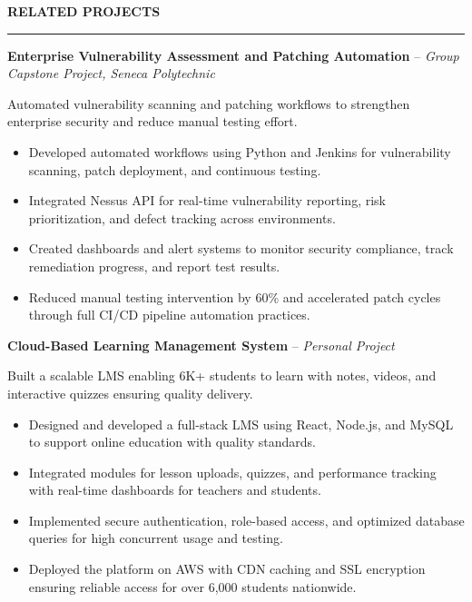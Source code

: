 \documentclass[10pt,letterpaper]{article}
\begin{document}
\vspace{6pt}

\textbf{RELATED PROJECTS}\\[-8pt]
\noindent\rule{\textwidth}{1pt}

\vspace{-2pt}

\textbf{Enterprise Vulnerability Assessment and Patching Automation} -- \emph{Group Capstone Project, Seneca Polytechnic}

\vspace{-1pt}

Automated vulnerability scanning and patching workflows to strengthen enterprise security and reduce manual testing effort.
\vspace{-1pt}
\begin{itemize}
\item Developed automated workflows using Python and Jenkins for vulnerability scanning, patch deployment, and continuous testing.
\item Integrated Nessus API for real-time vulnerability reporting, risk prioritization, and defect tracking across environments.
\item Created dashboards and alert systems to monitor security compliance, track remediation progress, and report test results.
\item Reduced manual testing intervention by 60\% and accelerated patch cycles through full CI/CD pipeline automation practices.
\end{itemize}

\textbf{Cloud-Based Learning Management System} -- \emph{Personal Project}

\vspace{-1pt}

Built a scalable LMS enabling 6K+ students to learn with notes, videos, and interactive quizzes ensuring quality delivery.
\vspace{-1pt}
\begin{itemize}
\item Designed and developed a full-stack LMS using React, Node.js, and MySQL to support online education with quality standards.
\item Integrated modules for lesson uploads, quizzes, and performance tracking with real-time dashboards for teachers and students.
\item Implemented secure authentication, role-based access, and optimized database queries for high concurrent usage and testing.
\item Deployed the platform on AWS with CDN caching and SSL encryption ensuring reliable access for over 6,000 students nationwide.
\end{itemize}
\end{document}
